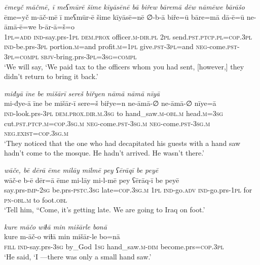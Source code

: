 \ea \label{BP.60}
\textit{ēmeyč māčmē, ī meʕmūrē šime kīyāsēnē bā biřew bāremā dēw nāmēwe bārāšo} \\ 
\gll ēme=yč m-āč-mē ī meʕmūr-ē šime kīyāsē=nē ∅-b-ā biře=ū bāre=mā dā-ē=ū ne-āmā-ē=we b-ār-ā=š=o \\ 
 \textsc{1pl}\textsc{=add} \textsc{ind-}say.prs\textsc{-\textsc{1pl}} \textsc{dem.prox} officer\textsc{.m}\textsc{-dir}\textsc{.pl} \textsc{2pl} send\textsc{.pst}\textsc{.ptcp}\textsc{.pl}\textsc{=cop}\textsc{.3pl} \textsc{ind-}be.prs\textsc{-3pl} portion\textsc{.m}=and profit\textsc{.m}\textsc{=\textsc{1pl}} give\textsc{.pst}\textsc{-3pl}=and \textsc{neg-}come\textsc{.pst}\textsc{-3pl}\textsc{=compl} \textsc{sbjv-}bring.prs\textsc{-3pl}\textsc{=3sg}\textsc{=compl} \\ 
\glt `We will say, ‘We paid tax to the officers whom you had sent, [however,] they didn’t return to bring it back.'
\z 
 
\ea \label{BP.76}
\textit{miđyā īne be mišārī sereš biřyen nāmā nāmā nīyā} \\ 
\gll mi-đye-ā īne be mišār-ī sere=š biřye=n ne-āmā-∅ ne-āmā-∅ nīye=ā \\ 
 \textsc{ind-}look.prs\textsc{-3pl} \textsc{dem.prox}\textsc{.dir}\textsc{.m}\textsc{.3sg} to hand\_saw\textsc{.m}\textsc{-obl}\textsc{.m} head\textsc{.m}\textsc{=3sg} cut\textsc{.pst}\textsc{.ptcp}\textsc{.m}\textsc{=cop}\textsc{.3sg}\textsc{.m} \textsc{neg-}come\textsc{.pst}\textsc{-3sg}\textsc{.m} \textsc{neg-}come\textsc{.pst}\textsc{-3sg}\textsc{.m} \textsc{\textsc{neg.}exist}\textsc{=cop}\textsc{.3sg}\textsc{.m} \\ 
\glt `They noticed that the one who had decapitated his guests with a hand saw hadn’t come to the mosque. He hadn’t arrived. He wasn’t there.'
\z 
 
\ea \label{BP.78}
\textit{wāče, bē dērā ēme milāy milmē pey ʕērāqī be peyē} \\ 
\gll wāč-e b-ē dēr=ā ēme mi-lāy mi-l-mē pey ʕērāq-ī be peyē \\ 
 say.prs-\textsc{imp-}\textsc{2sg} be.prs\textsc{-pstc}\textsc{.3sg} late\textsc{=cop}\textsc{.3sg}\textsc{.m} \textsc{1pl} \textsc{ind-}go\textsc{.adv} \textsc{ind-}go.prs\textsc{-\textsc{1pl}} for \textsc{pn}\textsc{-obl}\textsc{.m} to foot\textsc{.obl} \\ 
\glt `Tell him, “Come, it’s getting late. We are going to Iraq on foot.'
\z 
 
\ea \label{BP.82}
\textit{kure māčo wiɫā min mišārle bonā} \\ 
\gll kure m-āč-o wiɫā min mišār-le bo=nā \\ 
 \textsc{fill} \textsc{ind-}say.prs\textsc{-3sg} by\_God \textsc{1sg} hand\_saw\textsc{.m}\textsc{-dim} become.prs\textsc{=cop}\textsc{.3pl} \\ 
\glt `He said, ‘I —there was only a small hand saw.'
\z 
 
